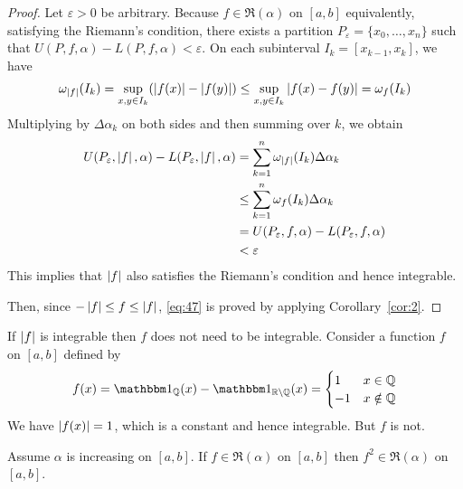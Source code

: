 \documentclass[thmcnt=section, color=blue, 12pt]{my-elegantbook}
\begin{document}
\begin{proof}
	Let $\varepsilon > 0$ be arbitrary.
	Because $f \in \mathfrak{R}(\alpha)$ on $[a, b]$
	equivalently, satisfying the Riemann's condition,
	there exists a partition $P_\varepsilon = \{x_0, \ldots, x_n\}$
	such that $U(P, f, \alpha) - L(P, f, \alpha) < \varepsilon$.
	On each subinterval $I_k = [x_{k-1}, x_k]$, we have
	\begin{align*}
		\omega_{\left\lvert f \right\rvert}(I_k)
		= \sup_{x, y \in I_k} ( \left\lvert f(x) \right\rvert - \left\lvert f(y) \right\rvert )
		\leq \sup_{x, y \in I_k} \left\lvert  f(x) - f(y)  \right\rvert
		= \omega_f(I_k)
	\end{align*}
	Multiplying by $\Delta \alpha_k$ on both sides and then summing over $k$,
	we obtain
	\begin{align*}
		U(P_\varepsilon, \left\lvert f \right\rvert, \alpha) - L(P_\varepsilon, \left\lvert f \right\rvert, \alpha)
		 & = \sum_{k=1}^n \omega_{\left\lvert f \right\rvert}(I_k) \Delta \alpha_k        \\
		 & \leq \sum_{k=1}^n \omega_{f}(I_k) \Delta \alpha_k           \\
		 & = U(P_\varepsilon, f, \alpha) - L(P_\varepsilon, f, \alpha) \\
		 & < \varepsilon
	\end{align*}
	This implies that $\left\lvert f \right\rvert$ also satisfies the Riemann's condition
	and hence integrable.

	Then, since $-\left\lvert f \right\rvert \leq f \leq \left\lvert f \right\rvert$, \eqref{eq:47}
	is proved by applying Corollary~\ref{cor:2}.
\end{proof}


\begin{example}
	If $\left\lvert f \right\rvert$ is integrable then $f$ does not need to be integrable.
	Consider a function $f$  on $[a, b]$ defined by
	\begin{align*}
		f(x) = \ind_{\Q}(x) - \ind_{\R \setminus \Q}(x)
		= \begin{cases}
			  1  & x \in \Q    \\
			  -1 & x \notin \Q
		  \end{cases}
	\end{align*}
	We have $\left\lvert f(x) \right\rvert = 1$, which is a constant and hence integrable.
	But $f$ is not.
\end{example}

\begin{theorem} \label{thm:10}
	Assume $\alpha$ is increasing on $[a, b]$.
	If $f \in \mathfrak{R}(\alpha)$ on $[a, b]$
	then $f^2 \in \mathfrak{R}(\alpha)$ on $[a, b]$.
\end{theorem}
\end{document}
